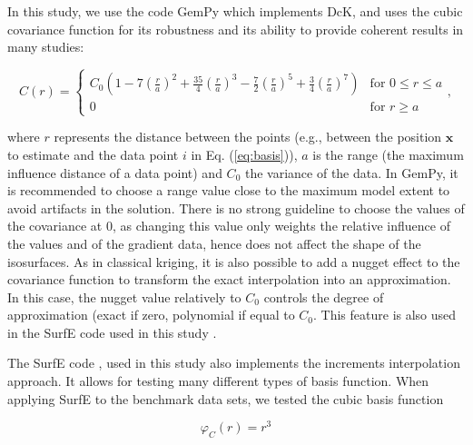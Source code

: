 \documentclass[preprint]{ring20}
\newcommand{\bx}{\mathbf{x}}
\begin{document}
In this study, we use the code GemPy \cite{delaVarga2018GMDD} which implements DcK, and uses the cubic covariance function for its  robustness and its ability to provide coherent results in many studies: 

\begin{equation}
C(r) = \begin{cases}
C_0(1-7(\frac{r}{a})^2+ \frac{35}{4}(\frac{r}{a})^3
- \frac{7}{2}(\frac{r}{a})^5 +\frac{3}{4}(\frac{r}{a})^7) &
\text{for } 0  \leq r \leq a \\
0 & \text{for } r  \geq a
\end{cases},
\end{equation}

\noindent where $r$ represents the distance between the points (e.g., between the position $\bx$ to estimate and the data point $i$ in Eq. (\ref{eq:basis})), $a$ is the range (the maximum influence distance of a data point) 
and $C_0$ the variance of the data. In GemPy, it is recommended to choose a range value close to the
maximum model extent to avoid artifacts in the solution. There is no strong guideline 
to choose the values of the covariance at 0, as changing this value only weights the relative influence of the values and of the gradient data, hence does not affect the shape of the isosurfaces. 
As in classical kriging, it is also possible to add a nugget effect to the covariance function to transform the exact interpolation into an approximation. In this case, the nugget value relatively to $C_0$ controls the degree of approximation (exact if zero, polynomial if equal to $C_0$. This feature is also used in the SurfE code used in this study \citep{Hillier2014MG}. %

The SurfE code \citep{Hillier2014MG}, used in this study also implements the increments interpolation approach. It allows for testing many different types of basis function. When applying SurfE to the benchmark data sets, we tested the cubic basis function 

\begin{equation}
\varphi_{C}(r) = r^3
\end{equation}
\end{document}

